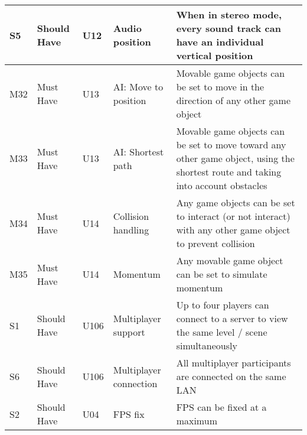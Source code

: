\documentclass{article} %
\begin{document}
\begin{longtable}{|p{}|p{}|p{}|p{}|p{}|}
    S5                          & Should Have                        & U12                & Audio position              & When in stereo mode, every sound track can have an individual vertical position                                                                             \\ \hline
    M32                         & Must Have                          & U13                & AI: Move to position        & Movable game objects can be set to move in the direction of any other game object                                                                           \\ \hline
    M33                         & Must Have                          & U13                & AI: Shortest path           & Movable game objects can be set to move toward any other game object, using the shortest route and taking into account obstacles                            \\ \hline
    M34                         & Must Have                          & U14                & Collision handling          & Any game objects can be set to interact (or not interact) with any other game object to prevent collision                                                   \\ \hline
    M35                         & Must Have                          & U14                & Momentum                    & Any movable game object can be set to simulate momentum                                                                                                     \\ \hline
    S1                          & Should Have                        & U106               & Multiplayer support         & Up to four players can connect to a server to view the same level / scene simultaneously                                                                    \\ \hline
    S6                          & Should Have                        & U106               & Multiplayer connection      & All multiplayer participants are connected on the same LAN                                                                                                  \\ \hline
    S2                          & Should Have                        & U04                & FPS fix                     & FPS can be fixed at a maximum                                                                                                                               \\ \hline

\end{longtable}
\end{document}
